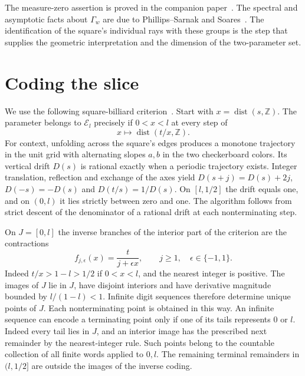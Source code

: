 \documentclass[11pt]{article}
\newcommand{\Z}{\mathbb Z}
\begin{document}
The measure-zero assertion is proved in the companion paper~\cite{periodic}. The spectral and asymptotic facts about $\Gamma_w$ are due to Phillips--Sarnak and Soares~\cite{PS,Soares}. The identification of the square's individual rays with these groups is the step that supplies the geometric interpretation and the dimension of the two-parameter set.

\section{Coding the slice}

We use the following square-billiard criterion~\cite[Theorem~1]{periodic}. Start with $x=\operatorname{dist}(s,\Z)$. The parameter belongs to $\mathcal E_l$ precisely if $0<x<l$ at every step of
\[
 x\longmapsto \operatorname{dist}(t/x,\Z).
\]
For context, unfolding across the square's edges produces a monotone trajectory in the unit grid with alternating slopes $a,b$ in the two checkerboard colors. Its vertical drift $D(s)$ is rational exactly when a periodic trajectory exists. Integer translation, reflection and exchange of the axes yield $D(s+j)=D(s)+2j$, $D(-s)=-D(s)$ and $D(t/s)=1/D(s)$. On $[l,1/2]$ the drift equals one, and on $(0,l)$ it lies strictly between zero and one. The algorithm follows from strict descent of the denominator of a rational drift at each nonterminating step.

On $J=[0,l]$ the inverse branches of the interior part of the criterion are the contractions
\[
 f_{j,\epsilon}(x)=\frac{t}{j+\epsilon x},\qquad j\ge1,\quad \epsilon\in\{-1,1\}.
\]
Indeed $t/x>1-l>1/2$ if $0<x<l$, and the nearest integer is positive. The images of $J$ lie in $J$, have disjoint interiors and have derivative magnitude bounded by $l/(1-l)<1$. Infinite digit sequences therefore determine unique points of $J$. Each nonterminating point is obtained in this way. An infinite sequence can encode a terminating point only if one of its tails represents $0$ or $l$. Indeed every tail lies in $J$, and an interior image has the prescribed next remainder by the nearest-integer rule. Such points belong to the countable collection of all finite words applied to $0,l$. The remaining terminal remainders in $(l,1/2]$ are outside the images of the inverse coding.
\end{document}

